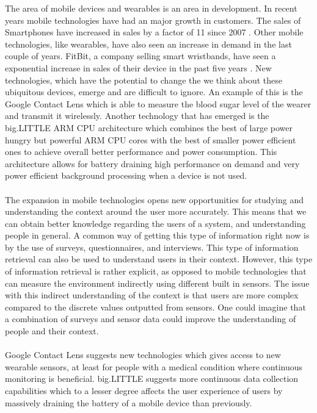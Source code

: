 The area of mobile devices and wearables is an area in development. In recent years mobile technologies have had an major growth in customers. The sales of Smartphones have increased in sales by a factor of 11 since 2007 \parencite{statsia_smartphones}. Other mobile technologies, like wearables, have also seen an increase in demand in the last couple of years. FitBit, a company selling smart wristbands, have seen a exponential increase in sales of their device in the past five years \parencite{statsia_fitbit}. New technologies, which have the potential to change the we think about these ubiquitous devices, emerge and are difficult to ignore. An example of this is the Google Contact Lens \parencite{google_contact_lens} which is able to measure the blood sugar level of the wearer and transmit it wirelessly. Another technology that has emerged is the big.LITTLE ARM CPU architecture \parencite{big_little_architecture} which combines the best of large power hungry but powerful ARM CPU cores with the best of smaller power efficient ones to achieve overall better performance and power consumption. This architecture allows for battery draining high performance on demand and very power efficient background processing when a device is not used. 
\\\\
The expansion in mobile technologies opens new opportunities for studying and understanding the context around the user more accurately. This means that we can obtain better knowledge regarding the users of a system, and understanding people in general. A common way of getting this type of information right now is by the use of surveys, questionnaires, and interviews. This type of information retrieval can also be used to understand users in their context. However, this type of information retrieval is rather explicit, as opposed to mobile technologies that can measure the environment indirectly using different built in sensors. The issue with this indirect understanding of the context is that users are more complex compared to the discrete values outputted from sensors. One could imagine that a combination of surveys and sensor data could improve the understanding of people and their context. 
\\\\
Google Contact Lens suggests new technologies which gives access to new wearable sensors, at least for people with a medical condition where continuous monitoring is beneficial. big.LITTLE suggests more continuous data collection capabilities which to a lesser degree affects the user experience of users by massively draining the battery of a mobile device than previously. 
